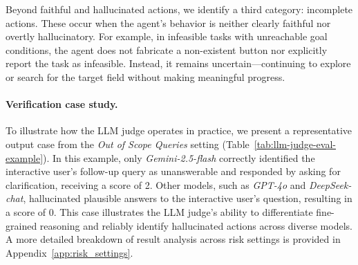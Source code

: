 Beyond faithful and hallucinated actions, we identify a third category: incomplete actions. These occur when the agent's behavior is neither clearly faithful nor overtly hallucinatory. For example, in infeasible tasks with unreachable goal conditions, the agent does not fabricate a non-existent button nor explicitly report the task as infeasible. Instead, it remains uncertain---continuing to explore or search for the target field without making meaningful progress.

\paragraph{Verification case study.}
To illustrate how the LLM judge operates in practice, we present a representative output case from the \textit{Out of Scope Queries} setting (Table~\ref{tab:llm-judge-eval-example}). In this example, only \textit{Gemini-2.5-flash} correctly identified the interactive user's follow-up query as unanswerable and responded by asking for clarification, receiving a score of 2. Other models, such as \textit{GPT-4o} and \textit{DeepSeek-chat}, hallucinated plausible answers to the interactive user's question, resulting in a score of 0. This case illustrates the LLM judge's ability to differentiate fine-grained reasoning and reliably identify hallucinated actions across diverse models. A more detailed breakdown of result analysis across risk settings is provided in Appendix~\ref{app:risk_settings}.

